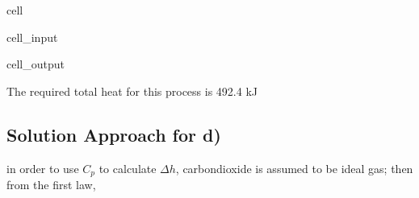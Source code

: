 \documentclass[letterpaper,10pt,english]{jupyterBook}
\begin{document}
\begin{sphinxuseclass}{cell}\begin{sphinxVerbatimInput}

\begin{sphinxuseclass}{cell_input}
\begin{sphinxVerbatim}[commandchars=\\\{\}]
   
   
      
     
\end{sphinxVerbatim}

\end{sphinxuseclass}\end{sphinxVerbatimInput}
\begin{sphinxVerbatimOutput}

\begin{sphinxuseclass}{cell_output}
\begin{sphinxVerbatim}[commandchars=\\\{\}]
The required total heat for this process is 492.4 kJ
\end{sphinxVerbatim}

\end{sphinxuseclass}\end{sphinxVerbatimOutput}

\end{sphinxuseclass}

\subsection{Solution Approach for d)}
\label{\detokenize{notebooks/Chapter5/CH5-Q2:solution-approach-for-d}}
\sphinxAtStartPar
in order to use \(C_p\) to calculate \(\Delta h\), carbon\sphinxhyphen{}dioxide is assumed to be ideal gas; then from the first law,
\end{document}
